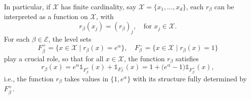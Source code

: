 \documentclass[a4paper, 11pt]{article}
\theoremstyle{definition}
\begin{document}
{In particular, if $\mathcal{X}$ has finite cardinality, say $\mathcal{X} = \{ x_1, \dots, x_d \}$, each $r_\beta$ can be interpreted as a function on $\mathcal{X}$, with
\[
r_\beta(x_j) = (r_\beta)_j, \quad \text{for } x_j \in \mathcal{X}.
\]
For each $\beta \in \mathcal{E}$, the level sets
\begin{equation}\label{eq: Fbeta+}
    F^+_\beta = \{ x \in \mathcal{X} \mid r_\beta(x) = e^\alpha \}, \quad
    F^-_\beta = \{ x \in \mathcal{X} \mid r_\beta(x) = 1 \}
\end{equation}
play a crucial role, so that for all $x \in \mathcal{X}$, the function $r_\beta$ satisfies
\begin{equation}\label{eq: r_beta_x}
    r_\beta(x) = e^\alpha \mathds{1}_{F^+_\beta}(x) + \mathds{1}_{F^-_\beta}(x)
    = 1 + \bigl(e^\alpha - 1\bigr) \mathds{1}_{F^+_\beta}(x),
\end{equation}
i.e., the function $r_\beta$ takes values in $\{1, e^\alpha\}$ with its structure fully determined by $F^+_\beta$.  

}
\end{document}

